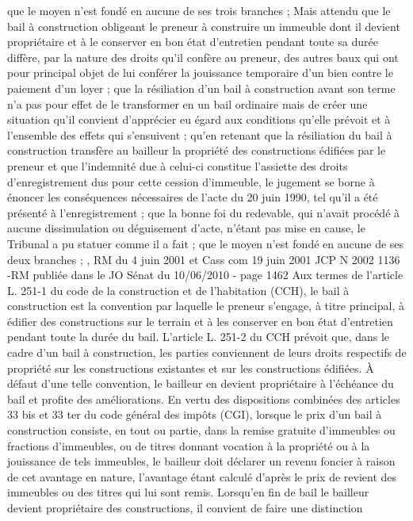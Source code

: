 \documentclass[11pt,a4paper]{report}
\begin{document}
	que le moyen n'est fondé en aucune de ses trois branches ;
	Mais attendu que le bail à construction obligeant le preneur à construire un immeuble dont il devient
	propriétaire et à le conserver en bon état d'entretien pendant toute sa durée diffère, par la nature des droits qu'il
	confère au preneur, des autres baux qui ont pour principal objet de lui conférer la jouissance temporaire d'un
	bien contre le paiement d'un loyer ; que la résiliation d'un bail à construction avant son terme n'a pas pour effet
	de le transformer en un bail ordinaire mais de créer une situation qu'il convient d'apprécier eu égard aux
	conditions qu'elle prévoit et à l'ensemble des effets qui s'ensuivent ; qu'en retenant que la résiliation du bail à
	construction transfère au bailleur la propriété des constructions édifiées par le preneur et que l'indemnité due à
	celui-ci constitue l'assiette des droits d'enregistrement dus pour cette cession d'immeuble, le jugement se borne à
	énoncer les conséquences nécessaires de l'acte du 20 juin 1990, tel qu'il a été présenté à l'enregistrement ; que
	la bonne foi du redevable, qui n'avait procédé à aucune dissimulation ou déguisement d'acte, n'étant pas mise en
	cause, le Tribunal a pu statuer comme il a fait ; que le moyen n'est fondé en aucune de ses deux branches ;
	, RM du 4 juin 2001 et Cass com 19 juin 2001 JCP N 2002 1136
	-RM publiée dans le JO Sénat du 10/06/2010 - page 1462
	Aux termes de l'article L. 251-1 du code de la construction et de l'habitation (CCH), le bail à construction est la
	convention par laquelle le preneur s'engage, à titre principal, à édifier des constructions sur le terrain et à les
	conserver en bon état d'entretien pendant toute la durée du bail. L'article L. 251-2 du CCH prévoit que, dans le
	cadre d'un bail à construction, les parties conviennent de leurs droits respectifs de propriété sur les
	constructions existantes et sur les constructions édifiées. À défaut d'une telle convention, le bailleur en devient
	propriétaire à l'échéance du bail et profite des améliorations. En vertu des dispositions combinées des articles
	33 bis et 33 ter du code général des impôts (CGI), lorsque le prix d'un bail à construction consiste, en tout ou
	partie, dans la remise gratuite d'immeubles ou fractions d'immeubles, ou de titres donnant vocation à la
	propriété ou à la jouissance de tels immeubles, le bailleur doit déclarer un revenu foncier à raison de cet
	avantage en nature, l'avantage étant calculé d'après le prix de revient des immeubles ou des titres qui lui sont
	remis. Lorsqu'en fin de bail le bailleur devient propriétaire des constructions, il convient de faire une distinction
\end{document}
